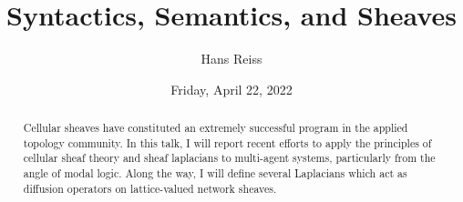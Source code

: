 \documentclass{UAmathtalk}
\author{Hans Reiss}
\title{Syntactics, Semantics, and Sheaves}
\date{Friday, April 22, 2022}
\begin{document}
\maketitle

\begin{abstract}
Cellular sheaves have constituted an extremely successful program in the applied topology community. In this talk, I will report recent efforts to apply the principles of cellular sheaf theory and sheaf laplacians to multi-agent systems, particularly from the angle of modal logic. Along the way, I will define several Laplacians which act as diffusion operators on lattice-valued network sheaves.
\end{abstract}
\end{document}
